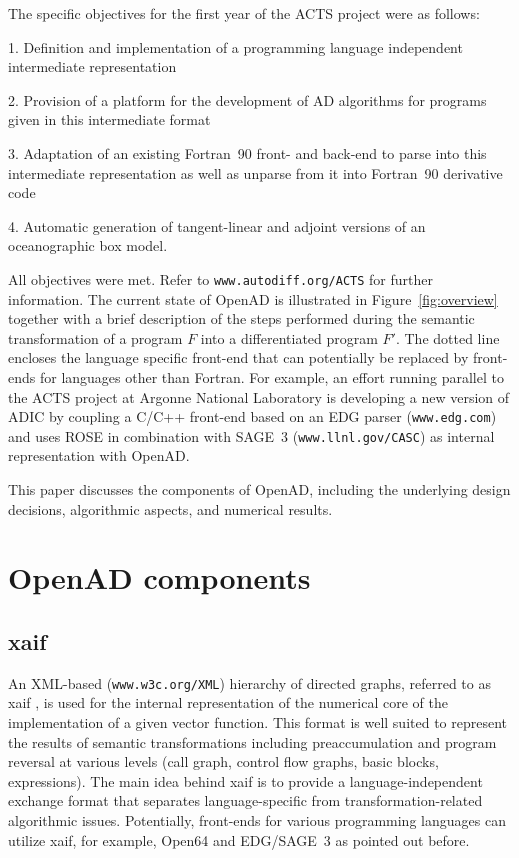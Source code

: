 \documentclass[acmtocl,acmnow]{acmtrans2m}
\newcommand{\fig}[1]{Figure~#1}
\begin{document}
The specific objectives for the first year of the ACTS project were
as follows:

1. Definition and implementation of a programming language independent 
intermediate representation

2. Provision of a platform for the development of AD algorithms for 
programs given in this intermediate format

3. Adaptation of an existing Fortran~90 front- and back-end to parse into 
this intermediate representation as well as unparse from it into Fortran~90
derivative code 

4. Automatic generation of tangent-linear and adjoint versions of 
an oceanographic box model.

All objectives were met. Refer to {\tt www.autodiff.org/ACTS} for further 
information.
The current state of OpenAD is illustrated in 
\fig{\ref{fig:overview}} together with a brief description of the steps
performed during the semantic transformation of a program $F$ into
a differentiated program $F'$.
The dotted line encloses the language specific front-end that can potentially
be replaced by front-ends for languages other than Fortran. For example, an 
effort running parallel to the ACTS project at Argonne National Laboratory is 
developing a new version of ADIC \cite{HoNo01} by coupling a C/C++ 
front-end 
based on an EDG parser ({\tt www.edg.com}) and uses ROSE in combination with SAGE~3 ({\tt www.llnl.gov/CASC}) as internal representation
with OpenAD.

This paper discusses the components of OpenAD,
including the underlying design decisions, algorithmic aspects, and
numerical results.

\section{OpenAD components}
\subsection{xaif} 
An XML-based ({\tt www.w3c.org/XML}) hierarchy of directed graphs, referred to as xaif 
\cite{HNN02}, is used for the 
internal representation of the numerical core of the implementation
of a given vector function. This format is 
well suited to represent the results of  semantic transformations including 
preaccumulation \cite{BiHa96,CDB96,GrRe91} and 
program reversal \cite{Gri92,WaGr01} at various levels (call graph, control 
flow graphs, basic blocks, expressions). 
The main idea behind xaif is to provide a language-independent exchange
format that separates language-specific from transformation-related 
algorithmic issues. Potentially, front-ends for various programming languages 
can utilize xaif, for example, Open64 and EDG/SAGE~3 as pointed out before.
\end{document}
